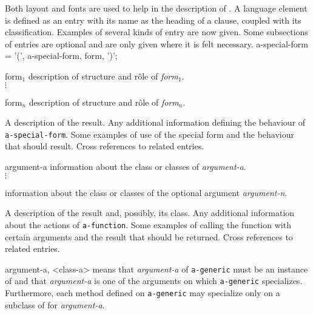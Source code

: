 %
\begin{optDefinition}
Both layout and fonts are used to help in the description of \eulisp.
A language element is defined as an entry with its name as the heading of a
clause, coupled with its classification.  Examples of several kinds of
entry are now given.  Some subsections of entries are optional and are
only given where it is felt necessary.
%
\Syntax
\label{a-special-form-syntax}
\savesyntax\aspecialformSyntax\vbox{\small\syntax
a-special-form
    = '(', a-special-form, {form}, ')';
\endsyntax}
%
\begin{arguments}
    \item[form$_1$] description of structure and r\^ole of {\em form$_1$}.\\
    $\vdots$
    \item[form$_n$] description of structure and r\^ole of {\em form$_n$}.
\end{arguments}
%
\result%
A description of the result.
%
\remarks%
Any additional information defining the behaviour of {\tt
    a-special-form}.
%
\examples
Some examples of use of the special form and the behaviour that should
result.
%
\seealso%
Cross references to related entries.
%
%
\begin{arguments}
    \item[argument-a] information about the class or classes of {\em
        argument-a}.\\
    $\vdots$
    \item[\optional{argument-n}] information about the class or classes of
    the optional argument {\em argument-n}.
\end{arguments}
%
\result%
A description of the result and, possibly, its class.
%
\remarks%
Any additional information about the actions of {\tt a-function}.
%
\examples
Some examples of calling the function with certain arguments and the
result that should be returned.
%
\seealso%
Cross references to related entries.
%
%
\begin{genericargs}
    \item[argument-a, <class-a>] means that {\em argument-a} of {\tt a-generic}
    must be an instance of {\tt <class-a>} and that {\em argument-a} is one of
    the arguments on which {\tt a-generic} specializes.  Furthermore, each
    method defined on {\tt a-generic} may
    specialize only on a subclass of {\tt <class-a>} for {\em argument-a}.\\

\end{genericargs}
\end{optDefinition}
